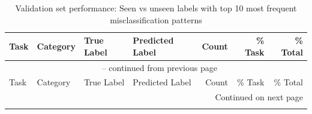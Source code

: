 \begingroup
\footnotesize
\setlength{\LTleft}{0pt}
\setlength{\LTright}{0pt}
\begin{longtable}{@{}llp{2.8cm}p{2.8cm}rrr@{}}
\caption{Validation set performance: Seen vs unseen labels with top 10 most frequent misclassification patterns\label{tab:seen_unseen_validation}}\\
\toprule
Task & Category & True Label & Predicted Label & Count & \% Task & \% Total \\
\midrule
\endfirsthead

\multicolumn{7}{c}{{\tablename\ \thetable{} -- continued from previous page}} \\
\toprule
Task & Category & True Label & Predicted Label & Count & \% Task & \% Total \\
\midrule
\endhead

\midrule
\multicolumn{7}{r}{{Continued on next page}} \\
\endfoot


\end{longtable}
